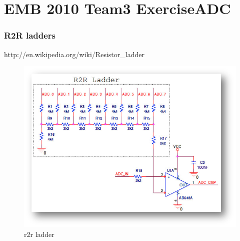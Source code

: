 

\part*{EMB 2010 Team3 ExerciseADC}

\section{R2R ladders}
http://en.wikipedia.org/wiki/Resistor\_ladder
\begin{figure}[htbp!]		%
	\begin{centering}
 		\includegraphics[width=1.0\textwidth]{images/r2r.png}
		\caption{r2r ladder}
	\end{centering}
\end{figure}
\newpage
